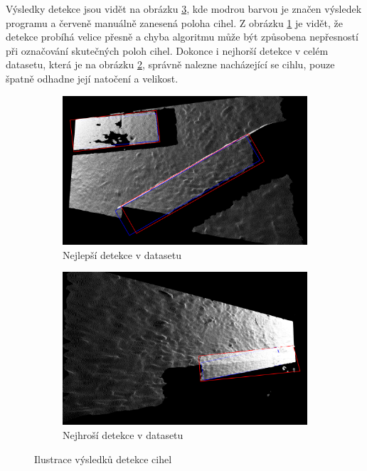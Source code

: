 \documentclass[twoside]{ctuthesis}
\begin{document}
Výsledky detekce jsou vidět na obrázku  \ref{fig:object_det_res}, kde modrou barvou je značen výsledek programu a červeně manuálně zanesená poloha cihel. Z obrázku \ref{subfig:object_det_good} je vidět, že detekce probíhá velice přesně a chyba algoritmu může být způsobena nepřesností při označování skutečných poloh cihel. Dokonce i nejhorší detekce v celém datasetu, která je na obrázku \ref{subfig:object_det_bad}, správně nalezne nacházející se cihlu, pouze špatně odhadne její natočení a velikost.

\begin{figure}
    \centering
    \begin{subfigure}{0.5\textwidth}
      \centering
      \includegraphics[width=0.99\linewidth]{pictures/res_det_good.png}
      \caption{Nejlepší detekce v datasetu}
      \label{subfig:object_det_good}
    \end{subfigure}
    \begin{subfigure}{0.49\textwidth}
      \centering
      \includegraphics[width=0.99\linewidth]{pictures/res_det_bad.png}
      \caption{Nejhroší detekce v datasetu}
      \label{subfig:object_det_bad}
    \end{subfigure}
    \caption{Ilustrace výsledků detekce cihel}
    \label{fig:object_det_res}
\end{figure}
 
\end{document}
